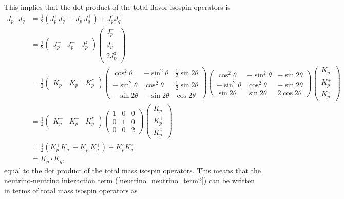 \documentclass[10pt]{article}
\begin{document}
This implies that the dot product of the total flavor isospin operators is
\begin{align}
J_p\cdot J_q
&=
\frac{1}{2}
(J^+_pJ^-_q+J^-_pJ^+_q)+J^z_pJ^z_q
\nonumber
\\
&=
\frac{1}{2}
\begin{pmatrix}
J^+_p & J^-_p & J^z_p
\end{pmatrix}
\begin{pmatrix}
J^-_p 
\\ 
J^+_p 
\\ 
2J^z_p
\end{pmatrix}
\nonumber
\\
&=
\frac{1}{2}
\begin{pmatrix}
K^+_p & K^-_p & K^z_p
\end{pmatrix}
\begin{pmatrix}
\cos^2\theta & -\sin^2\theta & \frac{1}{2}\sin2\theta \\
-\sin^2\theta & \cos^2\theta & \frac{1}{2}\sin2\theta \\
-\sin2\theta & -\sin2\theta & \cos2\theta
\end{pmatrix}
\begin{pmatrix}
\cos^2\theta & -\sin^2\theta & -\sin2\theta \\
-\sin^2\theta & \cos^2\theta & -\sin2\theta \\
\sin2\theta & \sin2\theta & 2\cos2\theta
\end{pmatrix}
\begin{pmatrix}
K^-_p 
\\ 
K^+_p 
\\ 
K^z_p
\end{pmatrix}
\nonumber
\\
&=
\frac{1}{2}
\begin{pmatrix}
K^+_p & K^-_p & K^z_p
\end{pmatrix}
\begin{pmatrix}
1 & 0 & 0 \\
0 & 1 & 0 \\
0 & 0 & 2
\end{pmatrix}
\begin{pmatrix}
K^-_p 
\\ 
K^+_p 
\\ 
K^z_p
\end{pmatrix}
\nonumber
\\
&=
\frac{1}{2}
(K^+_pK^-_q+K^-_pK^+_q)+K^z_pK^z_q
\\
&=
K_p\cdot K_q
,\end{align}
equal to the dot product of the total mass isospin operators. This means that the neutrino-neutrino interaction term (\ref{neutrino_neutrino_term2}) can be written in terms of total mass isospin operators as 
\end{document}

